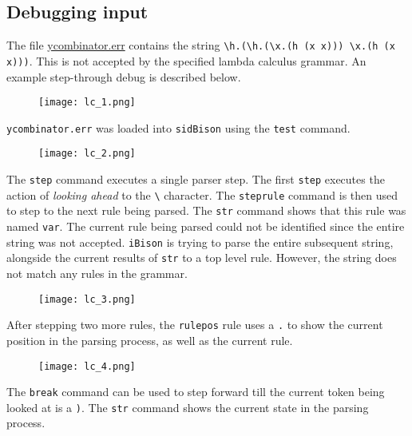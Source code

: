 \subsection{Debugging input}

The file \href{https://github.com/sidprasad/sidbison/blob/master/lambdacalcexample/input/ycombinator.err} {ycombinator.err} contains the string \verb|\h.(\h.(\x.(h (x x))) \x.(h (x x)))|. This is not accepted by the specified lambda calculus grammar. An example step-through debug is described below.\\



\begin{figure}[H] \centering
\texttt{[image: lc\_1.png]}
\end{figure}

\noindent

\verb|ycombinator.err| was loaded into \verb|sidBison| using the \verb|test| command.

\begin{figure}[H] \centering
\texttt{[image: lc\_2.png]}
\end{figure}

\noindent

The \verb|step| command executes a single parser step. The first \verb|step| executes the action of \textit{looking ahead} to the
\verb|\| character. The \verb|steprule| command is then used to step to the next rule being parsed. The \verb|str| command shows that this rule was named \verb|var|. The current rule being parsed could not be identified since the entire string was not accepted. \verb|iBison| is trying to parse the entire subsequent string, alongside the current results of \verb|str| to a top level rule. However, the string does not match any rules in the grammar.

\begin{figure}[H] \centering
\texttt{[image: lc\_3.png]}
\end{figure}

\noindent

After stepping two more rules, the \verb|rulepos| rule uses a \verb|.| to show the current  position in the parsing process, as well as the current rule.

\begin{figure}[H] \centering
\texttt{[image: lc\_4.png]}
\end{figure}

\noindent
The \verb|break| command can be used to step forward till the current token being looked at is a \verb|)|. The \verb|str| command shows the current state in the parsing process.

